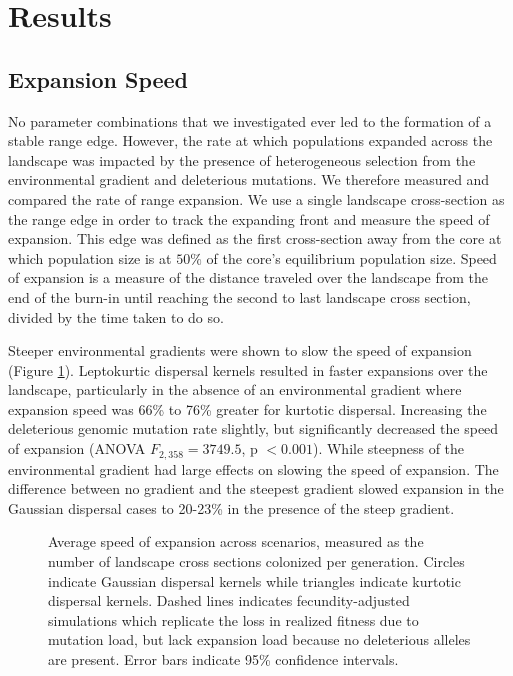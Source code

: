 \section{Results}

\subsection{Expansion Speed}
No parameter combinations that we investigated ever led to the formation of a stable range edge. However, the rate at which populations expanded across the landscape was impacted by the presence of heterogeneous selection from the environmental gradient and deleterious mutations. We therefore measured and compared the rate of range expansion. We use a single landscape cross-section as the range edge in order to track the expanding front and measure the speed of expansion. This edge was defined as the first cross-section away from the core at which population size is at $50\%$ of the core's equilibrium population size. Speed of expansion is a measure of the distance traveled over the landscape from the end of the burn-in until reaching the second to last landscape cross section, divided by the time taken to do so.

Steeper environmental gradients were shown to slow the speed of expansion (Figure \ref{fig:speed}). Leptokurtic dispersal kernels resulted in faster expansions over the landscape, particularly in the absence of an environmental gradient where expansion speed was 66\% to 76\% greater for kurtotic dispersal. Increasing the deleterious genomic mutation rate slightly, but significantly decreased the speed of expansion (ANOVA $F_{2,358} = 3749.5$,  p $< 0.001$). While steepness of the environmental gradient had large effects on slowing the speed of expansion. The difference between no gradient and the steepest gradient slowed expansion in the Gaussian dispersal cases to 20-23\% in the presence of the steep gradient.

\begin{figure}[h]
\centering
{}
\caption[Average speed of expansion.]{Average speed of expansion across scenarios, measured as the number of landscape cross sections colonized per generation. Circles indicate Gaussian dispersal kernels while triangles indicate kurtotic dispersal kernels. Dashed lines indicates fecundity-adjusted simulations which replicate the loss in realized fitness due to mutation load, but lack expansion load because no deleterious alleles are present. Error bars indicate 95\% confidence intervals.}
\label{fig:speed}
\end{figure}





